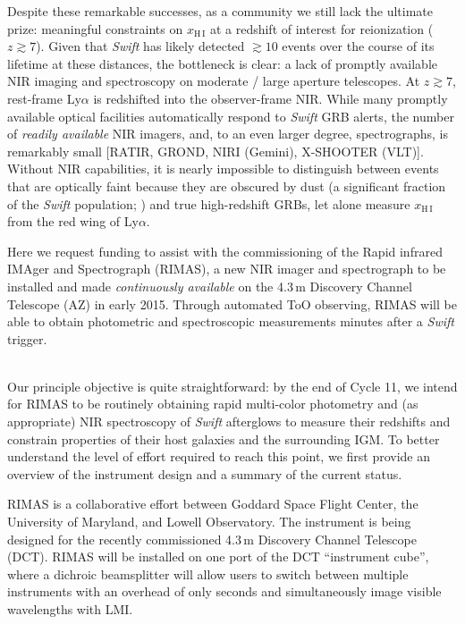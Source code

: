 \documentclass[letterpaper,11pt]{article}
\begin{document}
Despite these remarkable successes, as a community we still lack the ultimate
prize: meaningful constraints on $x_{\mathrm{H\,I}}$ at a redshift of interest
for reionization ($z \gtrsim 7$).  Given that \textit{Swift} has likely detected
$\gtrsim 10$ events over the course of its lifetime at these distances, the
bottleneck is clear: a lack of promptly available NIR imaging and spectroscopy 
on moderate / large aperture telescopes.  At $z \gtrsim 7$, rest-frame Ly$\alpha$
is redshifted into the observer-frame NIR.  While many promptly available 
optical facilities automatically respond to \textit{Swift} GRB alerts, the number
of \textit{readily available} NIR imagers, and, to an even larger degree,
spectrographs, is remarkably small [RATIR, GROND, NIRI (Gemini), X-SHOOTER (VLT)].
Without NIR capabilities, it is nearly impossible to distinguish between events
that are optically faint because they are obscured by dust (a significant fraction
of the \textit{Swift} population; \cite{ckh+09,pcb+09,gkk+11}) and true
high-redshift GRBs, let alone measure $x_{\mathrm{H\,I}}$ from the red wing of
Ly$\alpha$.

Here we request funding to assist with the commissioning of the Rapid infrared
IMAger and Spectrograph (RIMAS), a new NIR imager and spectrograph to be installed and made
\textit{continuously available} on the 4.3\,m Discovery Channel Telescope (AZ) in early 2015.
Through automated ToO observing, RIMAS will be able to obtain photometric and spectroscopic
measurements minutes after a \textit{Swift} trigger.

\smallskip

\smallskip\\
Our principle objective is quite straightforward: by the end of Cycle 11, we intend
for RIMAS to be routinely obtaining rapid multi-color photometry and (as appropriate) 
NIR spectroscopy of \textit{Swift} afterglows to measure their redshifts and constrain 
properties of their host galaxies and the surrounding IGM.  To better understand the 
level of effort required to reach this point, we first provide an overview of the 
instrument design and a summary of the current status.

\smallskip

RIMAS is a collaborative effort between Goddard Space Flight Center, the University of
Maryland, and Lowell Observatory.  The instrument is being designed for the recently
commissioned 4.3\,m Discovery Channel Telescope (DCT).  RIMAS will be installed on one 
port of the DCT ``instrument cube'', where a dichroic beamsplitter will allow users to
switch between multiple instruments with an overhead of only seconds and simultaneously
image visible wavelengths with LMI.
\end{document}
